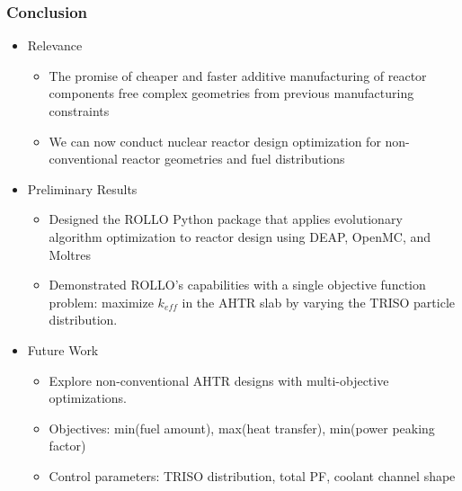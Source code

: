 \begin{frame}
    \frametitle{Conclusion}
    \begin{itemize}
        \item Relevance
        \begin{itemize}
            \item The promise of cheaper and faster additive manufacturing of reactor 
            components free complex geometries from previous manufacturing constraints
            \item We can now conduct nuclear reactor design optimization for 
            non-conventional reactor geometries and fuel distributions
        \end{itemize}
        \item Preliminary Results
        \begin{itemize}
            \item Designed the ROLLO Python package that applies 
            evolutionary algorithm optimization to reactor design using 
            DEAP, OpenMC, and Moltres
            \item Demonstrated ROLLO's capabilities with a single objective function 
            problem: maximize $k_{eff}$ in the AHTR slab by varying the 
            TRISO particle distribution. 
        \end{itemize} 
        \item Future Work
        \begin{itemize}
            \item Explore non-conventional AHTR designs with multi-objective optimizations. 
            \item Objectives: min(fuel amount), max(heat transfer), min(power peaking factor) 
            \item Control parameters: TRISO distribution, total PF, coolant channel shape 
        \end{itemize}
    \end{itemize}
    \vspace{-0.4cm}
    \begin{figure}[]
        \centering
\end{figure}
\end{frame}
